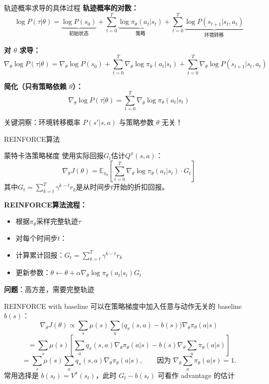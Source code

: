 \documentclass{beamer}
\begin{document}
\begin{frame}{轨迹概率求导的具体过程}
    \textbf{轨迹概率的对数：}
    \[
    \log P(\tau|\theta) = \underbrace{\log P(s_0)}_{\text{初始状态}} + \sum_{t=0}^{T} \underbrace{\log \pi_\theta(a_t|s_t)}_{\text{策略}} + \sum_{t=0}^{T} \underbrace{\log P(s_{t+1}|s_t, a_t)}_{\text{环境转移}}
    \]
    
    \textbf{对 $\theta$ 求导：}
    \[
    \nabla_\theta \log P(\tau|\theta) = \nabla_\theta \log P(s_0) + \sum_{t=0}^{T} \nabla_\theta \log \pi_\theta(a_t|s_t) + \sum_{t=0}^{T} \nabla_\theta \log P(s_{t+1}|s_t, a_t)
    \]
    
    \textbf{简化（只有策略依赖 $\theta$）：}
        \[
        \nabla_\theta \log P(\tau|\theta) = \sum_{t=0}^{T} \nabla_\theta \log \pi_\theta(a_t|s_t)
        \]
    
    {\small 关键洞察：环境转移概率 $P(s'|s,a)$ 与策略参数 $\theta$ 无关！}
\end{frame}

\begin{frame}{REINFORCE算法}
    \begin{block}{蒙特卡洛策略梯度}
        使用实际回报$G_t$估计$Q^{\pi}(s,a)$：
        \[ \nabla_\theta J(\theta) = \mathbb{E}_{\pi_\theta} \left[ \sum_{t=0}^{T} \nabla_\theta \log \pi_\theta(a_t|s_t) \cdot G_t \right] \]
        其中$G_t = \sum_{k=t}^{T} \gamma^{k-t} r_k$是从时间步$t$开始的折扣回报。
    \end{block}
    
    \textbf{REINFORCE算法流程：}
    \begin{itemize}
        \item 根据$\pi_\theta$采样完整轨迹$\tau$
        \item 对每个时间步$t$：
        \item 计算累计回报：$G_t = \sum_{k=t}^{T} \gamma^{k-t} r_k$
        \item 更新参数：$\theta \leftarrow \theta + \alpha \nabla_\theta \log \pi_\theta(a_t|s_t) G_t$
    \end{itemize}
    
    {\small \textbf{问题}：高方差，需要完整轨迹}
\end{frame}
\begin{frame}{REINFORCE with baseline}
          可以在策略梯度中加入任意与动作无关的 baseline $b(s)$：
          \[
          \nabla_\theta J(\theta)
          \propto
          \sum_s \mu(s)\sum_a \bigl(q_\pi(s,a)-b(s)\bigr)\nabla_\theta \pi_\theta(a|s)
          \]
          \[
          =
          \sum_s \mu(s)\left[
          \sum_a q_\pi(s,a)\nabla_\theta \pi_\theta(a|s)
          -
          b(s)\nabla_\theta \sum_a \pi_\theta(a|s)
          \right]
          \]
          \[
          =
          \sum_s \mu(s)\sum_a q_\pi(s,a)\nabla_\theta \pi_\theta(a|s),
          \qquad
          \text{因为 } \nabla_\theta\sum_a \pi_\theta(a|s)=1.
          \]
      {\small 常用选择是 $b(s_t)=V^\pi(s_t)$，此时 $G_t-b(s_t)$ 可看作 advantage 的估计}
  \end{frame}
\end{document}

